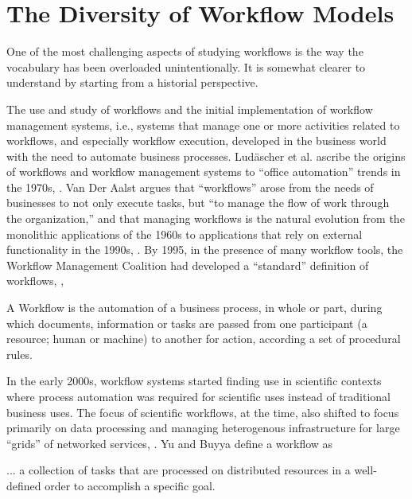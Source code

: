 \section{The Diversity of Workflow Models}\label{workflows}

One of the most challenging aspects of studying workflows is the way the
vocabulary has been overloaded unintentionally.  It is somewhat clearer to
understand by starting from a historial perspective.

The use and study of workflows and the initial implementation of workflow
management systems, i.e., systems that manage one or more activities related to
workflows, and especially workflow execution, developed in the business world
with the need to automate business processes. Lud\"{a}scher et al.  ascribe the
origins of workflows and workflow management systems to ``office automation''
trends in the 1970s, \cite{ludascher_scientific_2006}. Van Der Aalst argues that
``workflows'' arose from the needs of businesses to not only execute tasks, but
``to manage the flow of work through the organization,'' and that managing
workflows is the natural evolution from the monolithic applications of the 1960s
to applications that rely on external functionality in the 1990s,
\cite{van_der_aalst_application_1998}. By 1995, in the presence of many workflow
tools, the Workflow Management Coalition had developed a ``standard'' definition
of workflows, \cite{hollingsworth_workflow_1993},

\begin{displayquote} A Workflow is the automation of a business process, in
whole or part, during which documents, information or tasks are passed from one
participant (a resource; human or machine) to another for action, according a
set of procedural rules.  \end{displayquote}

In the early 2000s, workflow systems started finding use in scientific contexts
where process automation was required for scientific uses instead of traditional
business uses. The focus of scientific workflows, at the time, also shifted to
focus primarily on data processing and managing heterogenous infrastructure for
large ``grids'' of networked services,
\cite{yu_taxonomy_2005}. Yu and Buyya define a workflow as

\begin{displayquote} ... a collection of tasks that are processed on distributed
resources in a well-defined order to accomplish a specific goal.

\end{displayquote}

